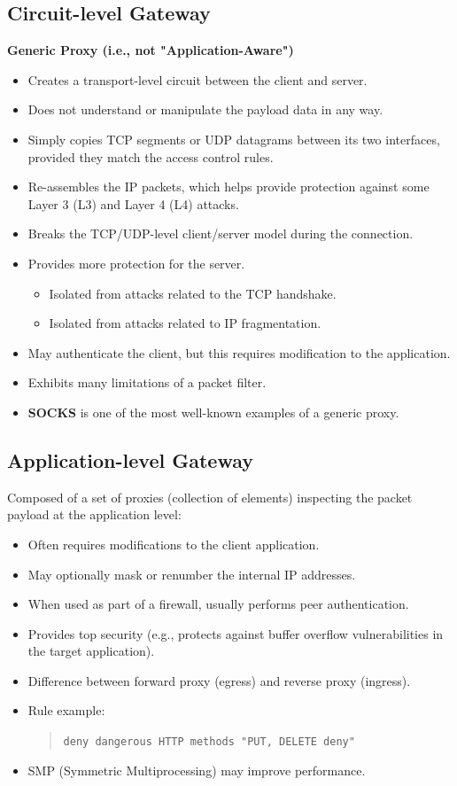 \subsection{Circuit-level Gateway}
\textbf{Generic Proxy (i.e., not "Application-Aware")}
\begin{itemize}
    \item Creates a transport-level circuit between the client and server.
    \item Does not understand or manipulate the payload data in any way.
    \item Simply copies TCP segments or UDP datagrams between its two interfaces, provided they match the access control rules.
    \item Re-assembles the IP packets, which helps provide protection against some Layer 3 (L3) and Layer 4 (L4) attacks.
    \item Breaks the TCP/UDP-level client/server model during the connection.
    \item Provides more protection for the server.
    \begin{itemize}
        \item Isolated from attacks related to the TCP handshake.
        \item Isolated from attacks related to IP fragmentation.
    \end{itemize} 
    \item May authenticate the client, but this requires modification to the application.
    \item Exhibits many limitations of a packet filter.
    \item \textbf{SOCKS} is one of the most well-known examples of a generic proxy.
\end{itemize}

\subsection{Application-level Gateway}
Composed of a set of proxies (collection of elements) inspecting the packet payload at the application level:
\begin{itemize}
    \item Often requires modifications to the client application.
    \item May optionally mask or renumber the internal IP addresses.
    \item When used as part of a firewall, usually performs peer authentication.
    \item Provides top security (e.g., protects against buffer overflow vulnerabilities in the target application).
    \item Difference between forward proxy (egress) and reverse proxy (ingress).
    \item Rule example:
    \begin{quote}
        \texttt{deny dangerous HTTP methods "PUT, DELETE deny"}
    \end{quote}
    \item SMP (Symmetric Multiprocessing) may improve performance.
\end{itemize}

